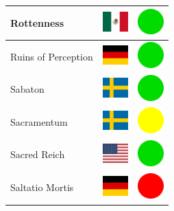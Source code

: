 \documentclass[12pt, a4paper, twoside]{report}
\begin{document}
\begin{center}
\begin{longtable}{|p{5cm}|p{2cm}|p{2cm}|}
 Rottenness                                                 & \includegraphics[width=1cm]{4x3/mx} &   \includegraphics[width=1cm]{likes/y} \\ \hline
 Ruins of Perception                                        & \includegraphics[width=1cm]{4x3/de} &   \includegraphics[width=1cm]{likes/y} \\ \hline
 Sabaton                                                    & \includegraphics[width=1cm]{4x3/se} &   \includegraphics[width=1cm]{likes/y} \\ \hline
 Sacramentum﻿                                                & \includegraphics[width=1cm]{4x3/se} &   \includegraphics[width=1cm]{likes/m} \\ \hline
 Sacred Reich                                               & \includegraphics[width=1cm]{4x3/us} &   \includegraphics[width=1cm]{likes/y} \\ \hline
 Saltatio Mortis                                            & \includegraphics[width=1cm]{4x3/de} &   \includegraphics[width=1cm]{likes/n} \\ \hline

\end{longtable}
\end{center}
\end{document}
